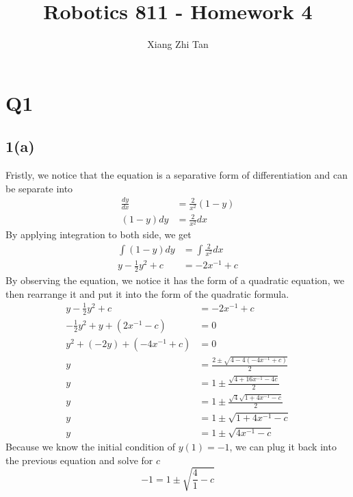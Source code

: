 \documentclass{article}
\begin{document}
\title{Robotics 811 - Homework 4}
\author{Xiang Zhi Tan}
\maketitle

\section{Q1}
\subsection*{1(a)}
Fristly, we notice that the equation is a separative form of differentiation and can be separate into 
\begin{equation*}
\begin{aligned}
\frac{dy}{dx} &= \frac{2}{x^2} (1-y) \\
(1-y) dy &= \frac{2}{x^2} dx 
\end{aligned}
\end{equation*}
By applying integration to both side, we get
\begin{equation*}
\begin{aligned}
\int (1-y) dy &= \int \frac{2}{x^2} dx \\
y - \frac{1}{2}y^2 + c &= -2 x^{-1} + c
\end{aligned}
\end{equation*}
By observing the equation, we notice it has the form of a quadratic equation, we then rearrange it and put it into the form of the quadratic formula.
\begin{equation*}
\begin{aligned}
y - \frac{1}{2}y^2 + c &= -2 x^{-1} + c\\
-\frac{1}{2}y^2 + y +(2x^{-1} - c) &= 0\\
y^2 + (-2y) +(-4x^{-1} + c) &= 0\\
y &= \frac{2 \pm \sqrt{4 - 4(-4x^{-1} + c)}}{2}\\
y &= 1 \pm \frac{\sqrt{4 + 16x^{-1} - 4c}}{2}\\
y &= 1 \pm \frac{\sqrt{4}\sqrt{1 + 4x^{-1} - c}}{2}\\
y &= 1 \pm \sqrt{1 + 4x^{-1} -c}\\
y &= 1 \pm \sqrt{4x^{-1} - c}
\end{aligned}
\end{equation*}
Because we know the initial condition of $y(1) = -1$, we can plug it back into the previous equation and solve for $c$
\begin{equation*}
-1 = 1 \pm \sqrt{\frac{4}{1} - c}
\end{equation*}
\end{document}
